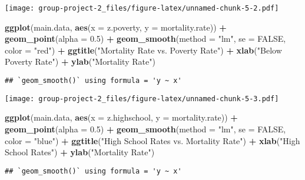 \documentclass[
]{article}
\newenvironment{Shaded}{\begin{snugshade}}{\end{snugshade}}
\newcommand{\AttributeTok}[1]{\textcolor[rgb]{0.13,0.29,0.53}{#1}}
\newcommand{\ConstantTok}[1]{\textcolor[rgb]{0.56,0.35,0.01}{#1}}
\newcommand{\FloatTok}[1]{\textcolor[rgb]{0.00,0.00,0.81}{#1}}
\newcommand{\FunctionTok}[1]{\textcolor[rgb]{0.13,0.29,0.53}{\textbf{#1}}}
\newcommand{\NormalTok}[1]{#1}
\newcommand{\SpecialCharTok}[1]{\textcolor[rgb]{0.81,0.36,0.00}{\textbf{#1}}}
\newcommand{\StringTok}[1]{\textcolor[rgb]{0.31,0.60,0.02}{#1}}
\begin{document}
\texttt{[image: group-project-2\_files/figure-latex/unnamed-chunk-5-2.pdf]}

\begin{Shaded}
\begin{Highlighting}[]
\FunctionTok{ggplot}\NormalTok{(main.data, }\FunctionTok{aes}\NormalTok{(}\AttributeTok{x =}\NormalTok{ z.poverty, }\AttributeTok{y =}\NormalTok{ mortality.rate)) }\SpecialCharTok{+}
  \FunctionTok{geom\_point}\NormalTok{(}\AttributeTok{alpha =} \FloatTok{0.5}\NormalTok{) }\SpecialCharTok{+}
  \FunctionTok{geom\_smooth}\NormalTok{(}\AttributeTok{method =} \StringTok{"lm"}\NormalTok{, }\AttributeTok{se =} \ConstantTok{FALSE}\NormalTok{, }\AttributeTok{color =} \StringTok{"red"}\NormalTok{) }\SpecialCharTok{+}
  \FunctionTok{ggtitle}\NormalTok{(}\StringTok{"Mortality Rate vs. Poverty Rate"}\NormalTok{) }\SpecialCharTok{+}
  \FunctionTok{xlab}\NormalTok{(}\StringTok{"Below Poverty Rate"}\NormalTok{) }\SpecialCharTok{+}
  \FunctionTok{ylab}\NormalTok{(}\StringTok{"Mortality Rate"}\NormalTok{)}
\end{Highlighting}
\end{Shaded}

\begin{verbatim}
## `geom_smooth()` using formula = 'y ~ x'
\end{verbatim}

\texttt{[image: group-project-2\_files/figure-latex/unnamed-chunk-5-3.pdf]}

\begin{Shaded}
\begin{Highlighting}[]
\FunctionTok{ggplot}\NormalTok{(main.data, }\FunctionTok{aes}\NormalTok{(}\AttributeTok{x =}\NormalTok{ z.highschool, }\AttributeTok{y =}\NormalTok{ mortality.rate)) }\SpecialCharTok{+}
  \FunctionTok{geom\_point}\NormalTok{(}\AttributeTok{alpha =} \FloatTok{0.5}\NormalTok{) }\SpecialCharTok{+}
  \FunctionTok{geom\_smooth}\NormalTok{(}\AttributeTok{method =} \StringTok{"lm"}\NormalTok{, }\AttributeTok{se =} \ConstantTok{FALSE}\NormalTok{, }\AttributeTok{color =} \StringTok{"blue"}\NormalTok{) }\SpecialCharTok{+}
  \FunctionTok{ggtitle}\NormalTok{(}\StringTok{"High School Rates vs. Mortality Rate"}\NormalTok{) }\SpecialCharTok{+}
  \FunctionTok{xlab}\NormalTok{(}\StringTok{"High School Rates"}\NormalTok{) }\SpecialCharTok{+}
  \FunctionTok{ylab}\NormalTok{(}\StringTok{"Mortality Rate"}\NormalTok{)}
\end{Highlighting}
\end{Shaded}

\begin{verbatim}
## `geom_smooth()` using formula = 'y ~ x'
\end{verbatim}
\end{document}
